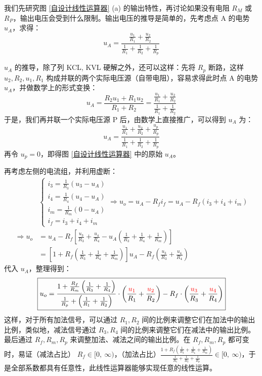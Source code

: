 \documentclass[UTF8]{report}
\theoremstyle{MyLineTheoremStyle} %
\theoremstyle{MyBlockTheoremStyle} %
\theoremstyle{MySubsubsectionStyle} %
\begin{document}
我们先研究图 \ref{自设计线性运算器} (a) 的输出特性，再讨论如果没有电阻 $R_M$ 或 $R_P$，输出电压会受到什么限制。输出电压的推导是简单的，先考虑点 A 的电势 $u_A$，求得：
\begin{equation}
u_A = \frac{\frac{u_1}{R_1} + \frac{u_2}{R_2}}{\frac{1}{R_1} + \frac{1}{R_2} + \frac{1}{R_p}}
\end{equation}

{\par\color{gray}\small
$u_A$ 的推导，除了列 KCL, KVL 硬解之外，还可以这样：先将 $R_p$ 断路，这样 $u_2, R_2, u_1, R_1$ 构成并联的两个实际电压源（自带电阻），容易求得此时点 A 的电势 $u_A$，并做数学上的形式变换：
\begin{equation}
u_A = \frac{R_2u_1 + R_1u_2}{R_1+R_2} =\frac{\frac{u_1}{R_1} + \frac{u_2}{R_2}}{\frac{1}{R_1} + \frac{1}{R_2} }
\end{equation}
于是，我们再并联一个实际电压源 P 后，由数学上直接推广，可以得到 $u_A$ 为：
\begin{equation}
    u_A = \frac{\frac{u_1}{R_1} + \frac{u_2}{R_2} + \frac{u_p}{R_p}}{\frac{1}{R_1} + \frac{1}{R_2} + \frac{1}{R_p}}
\end{equation}
再令 $u_p = 0$，即得图 \ref{自设计线性运算器} 中的原始 $u_A$。
\par}

再考虑左侧的电流组，并利用虚断：
\begin{align}
&\begin{cases}
    i_3 = \frac{1}{R_3}(u_3 - u_A) \\ 
    i_4 = \frac{1}{R_4}(u_4 - u_A) \\ 
    i_m = \frac{1}{R_m}(0 - u_A) \\ 
    i_f = i_3 + i_4 + i_m
\end{cases}
\Longrightarrow 
u_o = u_A - R_fi_f = u_A - R_f\left( i_3 + i_4 + i_m \right) \\ 
\Longrightarrow
u_o &=u_A - R_f \left[ 
\frac{u_3}{R_3} + \frac{u_4}{R_4} - u_A\left( \frac{1}{R_3} + \frac{1}{R_4} + \frac{1}{R_m} \right)
\right] \\ 
&=
\left[1 + R_f \left(\frac{1}{R_3} + \frac{1}{R_4} + \frac{1}{R_m} \right)\right] u_A - R_f \left( \frac{u_3}{R_3} + \frac{u_4}{R_4} \right) 
\end{align}
代入 $u_A$，整理得到：
\begin{equation}
\boxed{
    u_o= \frac{1 + \frac{R_f}{R_m} \left(\frac{1}{R_3} + \frac{1}{R_4}  \right)}{ \frac{1}{R_p} + \left(\frac{1}{R_1} + \frac{1}{R_2} \right)}\cdot \left( \frac{{\color{red} u_1}}{R_1} + \frac{{\color{red} u_2}}{R_2} \right) - R_f \cdot \left( \frac{{\color{red} u_3}}{R_3} + \frac{{\color{red} u_4}}{R_4} \right)
}
\end{equation}
这样，对于所有加法信号，可以通过 $R_1, R_2$ 间的比例来调整它们在加法中的输出比例，类似地，减法信号通过 $R_3, R_4$ 间的比例来调整它们在减法中的输出比例。最后通过 $R_f, R_m, R_p$ 来调整加法、减法之间的输出比例。在 $R_f, R_m, R_p$ 都可变时，易证（减法占比） $R_f \in [0,\ \infty)$，（加法占比）$\frac{1 + R_f \left(\frac{1}{R_3} + \frac{1}{R_4} + \frac{1}{R_m} \right)}{\frac{1}{R_1} + \frac{1}{R_2} + \frac{1}{R_p}} \in [0,\ \infty)$，于是全部系数都具有任意性，此线性运算器能够实现任意的线性运算。
\end{document}
